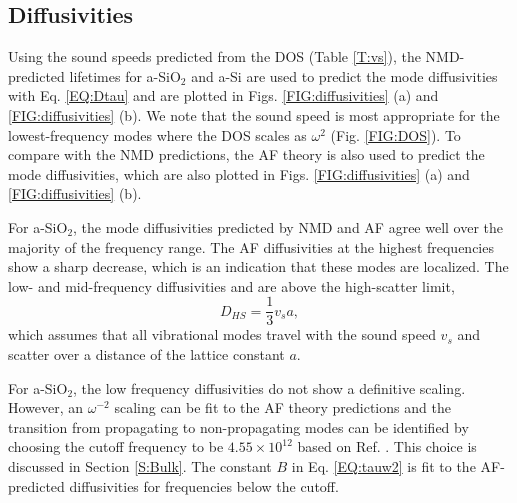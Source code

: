 \documentclass[aps,prb,twocolumn,superscriptaddress,footinbib,amsmath,amssymb,floatfix]{revtex4}
\begin{document}
\subsection{\label{S:Diffusivities}Diffusivities}

Using the sound speeds predicted 
from the DOS (Table \ref{T:vs}), the NMD-predicted lifetimes 
for a-SiO$_2$ and a-Si are used to predict the mode diffusivities with 
Eq. \eqref{EQ:Dtau} and are plotted in Figs. \ref{FIG:diffusivities} (a) 
and \ref{FIG:diffusivities} (b).  
We note that the sound speed is most appropriate  
for the lowest-frequency modes where the DOS scales as $\omega^2$ 
(Fig. \ref{FIG:DOS}). To compare with 
the NMD predictions, the AF theory is also used to predict the mode 
diffusivities, which are also plotted in 
Figs. \ref{FIG:diffusivities} (a) and \ref{FIG:diffusivities} (b). 

For a-SiO$_2$, the mode diffusivities predicted by NMD and AF agree 
well over the majority of the frequency range. The AF diffusivities at 
the highest frequencies 
show a sharp decrease, which is an indication 
that these modes are localized.\cite{feldman_thermal_1993} 
The low- and mid-frequency diffusivities and are above the 
high-scatter limit, 
\begin{equation}\label{EQ:D_HS}
D_{HS} = \frac{1}{3} v_s a,
\end{equation}
which assumes that all vibrational modes travel with the sound speed  
$v_s$ and scatter over a distance of the lattice constant $a$.
\cite{cahill_lattice_1988} 

For a-SiO$_2$, the low frequency diffusivities do not show a 
definitive scaling. However, an $\omega^{-2}$ scaling can be fit 
to the AF theory predictions and the transition from 
propagating to non-propagating modes can be identified by 
choosing the cutoff frequency to be $4.55\times10^{12}$ 
based on Ref. . 
This choice is discussed in Section \ref{S:Bulk}. The constant 
$B$ in Eq. \eqref{EQ:tauw2} 
is fit to the AF-predicted diffusivities for 
frequencies below the cutoff. 
\end{document}

